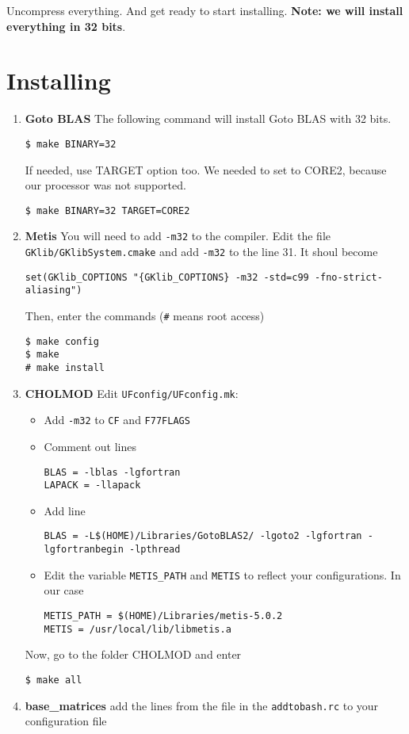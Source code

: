 \documentclass[letterpaper,11pt]{article}
\numberwithin{equation}{section}
\newcommand{\makesec}[1]{\section[#1]{#1}}
\begin{document}
Uncompress everything. And get ready to start installing. {\bf Note: we will install everything in 32 bits}.

\makesec{Installing}

\begin{enumerate}
 \item {\bf Goto BLAS} The following command will install Goto BLAS with 32 bits.
\begin{verbatim}
$ make BINARY=32
\end{verbatim}
If needed, use TARGET option too. We needed to set to CORE2, because our processor was not supported.
\begin{verbatim}
$ make BINARY=32 TARGET=CORE2
\end{verbatim}
 \item {\bf Metis} You will need to add \verb+-m32+ to the compiler. Edit the file \verb+GKlib/GKlibSystem.cmake+ and add \verb+-m32+ to the line 31. It shoul become
\begin{verbatim}
set(GKlib_COPTIONS "{GKlib_COPTIONS} -m32 -std=c99 -fno-strict-aliasing")
\end{verbatim}
Then, enter the commands (\verb+#+ means root access)
\begin{verbatim}
$ make config
$ make
# make install
\end{verbatim}
 \item {\bf CHOLMOD} Edit \verb+UFconfig/UFconfig.mk+:
  \begin{itemize}
   \item Add \verb+-m32+ to \verb+CF+ and \verb+F77FLAGS+
   \item Comment out lines
\begin{verbatim}
BLAS = -lblas -lgfortran
LAPACK = -llapack
\end{verbatim}
   \item Add line
\begin{verbatim}
BLAS = -L$(HOME)/Libraries/GotoBLAS2/ -lgoto2 -lgfortran -lgfortranbegin -lpthread
\end{verbatim}
  \item Edit the variable \verb+METIS_PATH+ and \verb+METIS+ to reflect your configurations. In our case
    \begin{verbatim}
METIS_PATH = $(HOME)/Libraries/metis-5.0.2
METIS = /usr/local/lib/libmetis.a
    \end{verbatim}
  \end{itemize}
  Now, go to the folder CHOLMOD and enter
\begin{verbatim}
$ make all
\end{verbatim}
 \item {\bf base\_matrices} add the lines from the file in the \verb+addtobash.rc+ to your configuration file


\end{enumerate}
\end{document}
